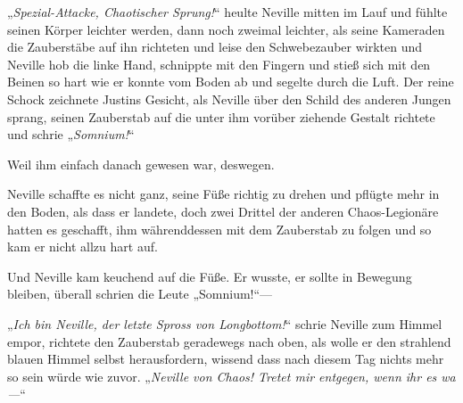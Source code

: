 „\emph{Spezial-Attacke, Chaotischer Sprung!}“ heulte Neville mitten im Lauf und fühlte seinen Körper leichter werden, dann noch zweimal leichter, als seine Kameraden die Zauberstäbe auf ihn richteten und leise den Schwebezauber wirkten und Neville hob die linke Hand, schnippte mit den Fingern und stieß sich mit den Beinen so hart wie er konnte vom Boden ab und segelte durch die Luft. Der reine Schock zeichnete Justins Gesicht, als Neville über den Schild des anderen Jungen sprang, seinen Zauberstab auf die unter ihm vorüber ziehende Gestalt richtete und schrie „\emph{Somnium!}“

Weil ihm einfach danach gewesen war, deswegen.

Neville schaffte es nicht ganz, seine Füße richtig zu drehen und pflügte mehr in den Boden, als dass er landete, doch zwei Drittel der anderen Chaos-Legionäre hatten es geschafft, ihm währenddessen mit dem Zauberstab zu folgen und so kam er nicht allzu hart auf.

Und Neville kam keuchend auf die Füße. Er wusste, er sollte in Bewegung bleiben, überall schrien die Leute „Somnium!“—

„\emph{Ich bin Neville, der letzte Spross von Longbottom!}“ schrie Neville zum Himmel empor, richtete den Zauberstab geradewegs nach oben, als wolle er den strahlend blauen Himmel selbst herausfordern, wissend dass nach diesem Tag nichts mehr so sein würde wie zuvor. „\emph{Neville von Chaos! Tretet mir entgegen, wenn ihr es wa—}“

